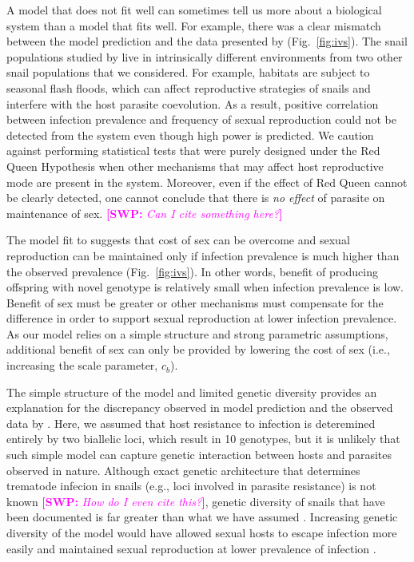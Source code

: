 \documentclass{article}\usepackage[]{graphicx}\usepackage[]{color}
\newcommand{\comment}[3]{\textcolor{#1}{\textbf{[#2: }\textit{#3}\textbf{]}}}
\newcommand{\swp}[1]{\comment{magenta}{SWP}{#1}}
\newcommand{\fref}[1]{Fig.~\ref{fig:#1}}
\begin{document}
A model that does not fit well can sometimes tell us more about a biological system than a model that fits well.
For example, there was a clear mismatch between the model prediction and the data presented by \cite{dagan2013clonal} (\fref{ivs}).
The snail populations studied by \cite{dagan2013clonal} live in intrinsically different environments from two other snail populations that we considered.
For example, habitats are subject to seasonal flash floods, which can affect reproductive strategies of snails \citep{ben2007temporal} and interfere with the host parasite coevolution.
As a result, positive correlation between infection prevalence and frequency of sexual reproduction could not be detected from the system even though high power is predicted.
We caution against performing statistical tests that were purely designed under the Red Queen Hypothesis when other mechanisms that may affect host reproductive mode are present in the system.
Moreover, even if the effect of Red Queen cannot be clearly detected, one cannot conclude that there is \emph{no effect} of parasite on maintenance of sex. \swp{Can I cite something here?}

The model fit to \cite{mckone2016fine} suggests that cost of sex can be overcome and sexual reproduction can be maintained only if infection prevalence is much higher than the observed prevalence (\fref{ivs}).
In other words, benefit of producing offspring with novel genotype is relatively small when infection prevalence is low.
Benefit of sex must be greater or other mechanisms must compensate for the difference in order to support sexual reproduction at lower infection prevalence.
As our model relies on a simple structure and strong parametric assumptions, additional benefit of sex can only be provided by lowering the cost of sex (i.e., increasing the scale parameter, $c_b$).

The simple structure of the model and limited genetic diversity provides an explanation for the discrepancy observed in model prediction and the observed data by \cite{mckone2016fine}.
Here, we assumed that host resistance to infection is deteremined entirely by two biallelic loci, which result in 10 genotypes, but it is unlikely that such simple model can capture genetic interaction between hosts and parasites observed in nature.
Although exact genetic architecture that determines trematode infecion in snails (e.g., loci involved in parasite resistance) is not known \swp{How do I even cite this?}, genetic diversity of snails that have been documented is far greater than what we have assumed \citep{king2011parasites, dagan2013clonal}.
Increasing genetic diversity of the model would have allowed sexual hosts to escape infection more easily and maintained sexual reproduction at lower prevalence of infection \citep{lively2010effect, king2012does, ashby2015diversity}.
\end{document}
